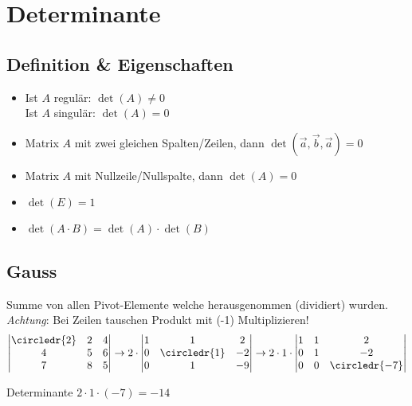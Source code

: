 \section{Determinante}\label{detmenge}

\subsection{Definition \& Eigenschaften}
\begin{itemize}[nosep]
	\item Ist $A$ regulär: $\det(A) \neq 0$\\
	      Ist $A$ singulär: $\det(A) = 0$
	\item Matrix $A$ mit zwei gleichen Spalten/Zeilen, dann $\det(\vec{a}, \vec{b}, \vec{a}) = 0$
	\item Matrix $A$ mit Nullzeile/Nullspalte, dann $\det(A) = 0$
	\item $\det(E) = 1$
	\item $\det(A \cdot B) = \det(A) \cdot \det(B)$
\end{itemize}

\subsection{Gauss}
Summe von allen Pivot-Elemente welche herausgenommen (dividiert) wurden. \textit{Achtung}: Bei Zeilen tauschen Produkt mit (-1) Multiplizieren!
\[
	\begin{vmatrix}
		\circledr{2} & 2 & 4 \\
		4 & 5 & 6 \\
		7 & 8 & 5 \\
	\end{vmatrix}
	\rightarrow
	2 \cdot \begin{vmatrix}
		1 & 1 & 2 \\
		0 & \circledr{1} & -2 \\
		0 & 1 & -9 \\
	\end{vmatrix}
	\rightarrow
	2 \cdot 1 \cdot \begin{vmatrix}
	1 & 1 & 2 \\
	0 & 1 & -2 \\
	0 & 0 & \circledr{-7} \\
\end{vmatrix}
\]

Determinante $2 \cdot 1 \cdot (-7) = -14$

